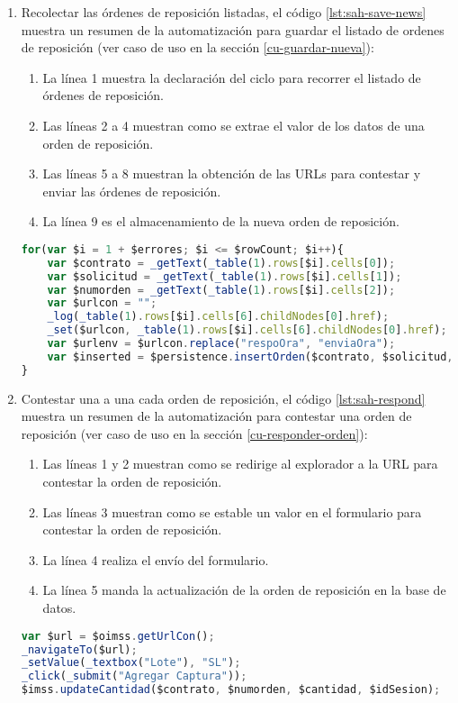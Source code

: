 \begin{enumerate}
	\item Recolectar las órdenes de reposición listadas, el código \ref{lst:sah-save-news} muestra un resumen de la automatización para guardar el listado de ordenes de reposición (ver caso de uso en la sección \ref{cu-guardar-nueva}):
	\begin{enumerate}
		\item La línea 1 muestra la declaración del ciclo para recorrer el listado de órdenes de reposición.
		\item Las líneas 2 a 4 muestran como se extrae el valor de los datos de una orden de reposición.
		\item Las líneas 5 a 8 muestran la obtención de las URLs para contestar y enviar las órdenes de reposición.
		\item La línea 9 es el almacenamiento de la nueva orden de reposición. 
	\end{enumerate}
	\begin{lstlisting}[language=Javascript, caption={Guardar lista de órdenes de reposición.}, label={lst:sah-save-news}]
for(var $i = 1 + $errores; $i <= $rowCount; $i++){
	var $contrato = _getText(_table(1).rows[$i].cells[0]);
	var $solicitud = _getText(_table(1).rows[$i].cells[1]);
	var $numorden = _getText(_table(1).rows[$i].cells[2]);
	var $urlcon = "";
	_log(_table(1).rows[$i].cells[6].childNodes[0].href);
	_set($urlcon, _table(1).rows[$i].cells[6].childNodes[0].href);
	var $urlenv = $urlcon.replace("respoOra", "enviaOra");
	var $inserted = $persistence.insertOrden($contrato, $solicitud, $numorden, $expedicion, $almacen, $urlcon, $urlenv, $idSesion);
}
	\end{lstlisting}

	\item Contestar una a una cada orden de reposición, el código \ref{lst:sah-respond} muestra un resumen de la automatización para contestar una orden de reposición (ver caso de uso en la sección \ref{cu-responder-orden}):
	\begin{enumerate}
		\item Las líneas 1 y 2 muestran como se redirige al explorador a la URL para contestar la orden de reposición.
		\item  Las líneas 3 muestran como se estable un valor en el formulario para contestar la orden de reposición.
		\item La línea 4 realiza el envío del formulario.
		\item La línea 5 manda la actualización de la orden de reposición en la base de datos.
	\end{enumerate}
	\begin{lstlisting}[language=Javascript, caption={Responder orden de reposición.}, label={lst:sah-respond}]
var $url = $oimss.getUrlCon();
_navigateTo($url);
_setValue(_textbox("Lote"), "SL");
_click(_submit("Agregar Captura"));
$imss.updateCantidad($contrato, $numorden, $cantidad, $idSesion);
	\end{lstlisting}


\end{enumerate}
